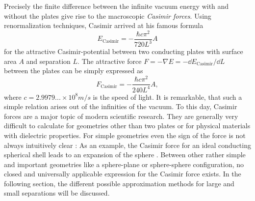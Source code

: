 Precisely the finite difference between the infinite vacuum energy with and without the plates give rise to the macroscopic \emph{Casimir forces}.
Using renormalization techniques, Casimir arrived at his famous formula \cite{Casimir_1948}
\begin{equation}\label{eq:3:casimir-energy-pp-conducting}
  E_\mathrm{Casimir} = -\frac{\hbar c \pi^2}{720 L^3} A
\end{equation}
for the attractive Casimir-potential between two conducting plates with surface area $A$ and separation $L$.
The attractive force $F=-\nabla E = -\dd E_\mathrm{Casimir} / \dd L$ between the plates can be simply expressed as
\begin{equation}\label{eq:3:casimir-force-pp-conducting}
  F_\mathrm{Casimir} = - \frac{\hbar c \pi^2}{240 L^4} A ,
\end{equation}
where $c=2.9979...\times 10^{8}\si{m/s}$ is the speed of light.
It is remarkable, that such a simple relation arises out of the infinities of the vacuum.
To this day, Casimir forces are a major topic of modern scientific research. They are generally very difficult to calculate for geometries other than two plates or for physical materials with dielectric properties. 
For simple geometries even the sign of the force is not always intuitively clear \cite{Klimchitskaya_2009}: As an example, the Casimir force for an ideal conducting spherical shell leads to an expansion of the sphere \cite{Boyer_1968}.
Between other rather simple and important geometries like a sphere-plane or sphere-sphere configuration, no closed and universally applicable expression for the Casimir force exists.
In the following section, the different possible approximation methods for large and small separations will be discussed.


